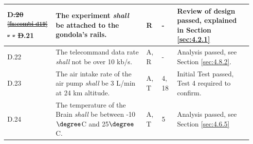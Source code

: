 \documentclass[a4paper,12pt,twoside]{article}
\providecommand{\DIFdeltex}[1]{{\protect\color{red}\sout{#1}}}                      %
\providecommand{\DIFdelbegin}{} %
\providecommand{\DIFdelend}{} %
\providecommand{\DIFdel}[1]{\texorpdfstring{\DIFdeltex{#1}}{}} %
\newcommand{\DIFscaledelfig}{0.5}
\newlength{\DIFdelgraphicswidth} %
\newlength{\DIFdelgraphicsheight} %
\newcommand{\DIFdelincludegraphics}[2][]{%
\sbox{\DIFdelgraphicsbox}{\DIFOincludegraphics[#1]{#2}}%
\settoboxwidth{\DIFdelgraphicswidth}{\DIFdelgraphicsbox} %
\settoboxtotalheight{\DIFdelgraphicsheight}{\DIFdelgraphicsbox} %
\scalebox{\DIFscaledelfig}{%
\parbox[b]{\DIFdelgraphicswidth}{\usebox{\DIFdelgraphicsbox}\\[-\baselineskip] \rule{\DIFdelgraphicswidth}{0em}}\llap{\resizebox{\DIFdelgraphicswidth}{\DIFdelgraphicsheight}{%
\setlength{\unitlength}{\DIFdelgraphicswidth}%
\begin{picture}(1,1)%
\thicklines\linethickness{2pt} %
{\color[rgb]{1,0,0}\put(0,0){\framebox(1,1){}}}%
{\color[rgb]{1,0,0}\put(0,0){\line( 1,1){1}}}%
{\color[rgb]{1,0,0}\put(0,1){\line(1,-1){1}}}%
\end{picture}%
}\hspace*{3pt}}} %
} %
\DeclareRobustCommand{\DIFdelbegin}{\DIFOdelbegin \let\includegraphics\DIFdelincludegraphics} %
\DeclareRobustCommand{\DIFdelend}{\DIFOaddend \let\includegraphics\DIFOincludegraphics} %
\begin{document}
\begin{longtable}[]{|m{}| m{} |m{} |m{}|m{}|}
D\DIFdelbegin \DIFdel{.20 }%
\DIFdel{\textsuperscript{\ref{fn:combi-d19}}                                                                               }%
\DIFdel{-        }%
\DIFdel{-            }%
\DIFdel{D}\DIFdelend .21 & The experiment \textit{shall} be attached to the gondola’s rails.                                                                                &     R         & -            &  Review of design passed, explained in Section \ref{sec:4.2.1}     
\\ \hline
D.22 & The telecommand data rate \textit{shall} not be over 10 kb/s.                                                                               &     A, R         & -            &    Analysis passed, see Section \ref{sec:4.8.2}.   
\\  \hline

D.23 & The air intake rate of the air pump \textit{shall} be 3 L/min at 24 km altitude.                                                                                                                        &       A, T        & 4, 18            &  Initial Test passed, Test 4 required to confirm.      \\ \hline

D.24 & The temperature of the Brain \textit{shall} be between -10$\degree$C and 25$\degree$C.                                                                                                 &       A, T       & 5           & Analysis passed, see Section \ref{sec:4.6.5}       \\    \hline
\DIFdelbegin %


\end{longtable}
\end{document}
